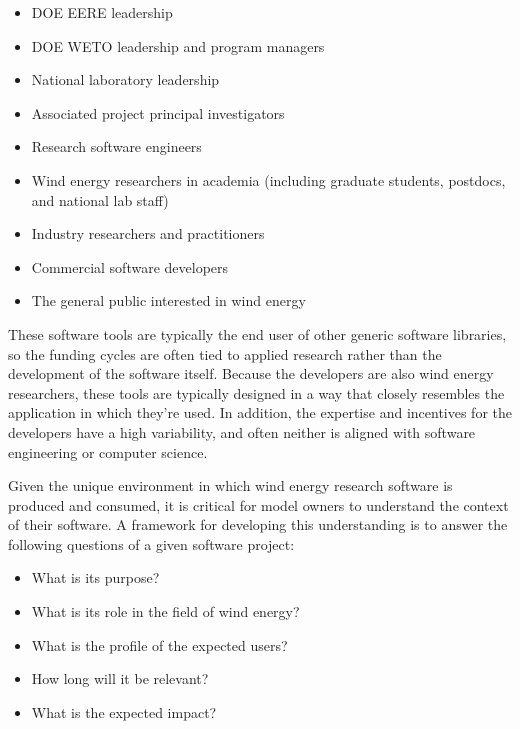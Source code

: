\documentclass[]{nrel}
\begin{document}
\begin{itemize}
\item DOE EERE leadership

\item DOE WETO leadership and program managers

\item National laboratory leadership

\item Associated project principal investigators

\item Research software engineers

\item Wind energy researchers in academia
(including graduate students, postdocs, and national lab staff)

\item Industry researchers and practitioners

\item Commercial software developers

\item The general public interested in wind energy

\end{itemize}

These software tools are typically the end user of other generic software libraries, so
the funding cycles are often tied to applied research rather than the development of the
software itself. Because the developers are also wind energy researchers, these tools are
typically designed in a way that closely resembles the application in which they’re used.
In addition, the expertise and incentives for the developers have a high variability, and
often neither is aligned with software engineering or computer science.

Given the unique environment in which wind energy research software is produced and consumed,
it is critical for model owners to understand the context of their software. A framework
for developing this understanding is to answer the following questions of a given software project:

\begin{itemize}
\item What is its purpose?

\item What is its role in the field of wind energy?

\item What is the profile of the expected users?

\item How long will it be relevant?

\item What is the expected impact?

\end{itemize}
\end{document}
